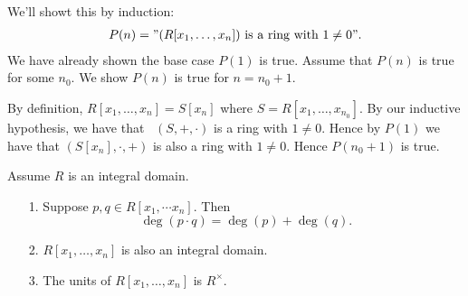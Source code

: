 \begin{prf}
    We'll showt this by induction:
    \begin{align*}
        P(n) = "(R[x_1, \dots, x_n]) \text{ is a ring with } 1 \ne 0".
    \end{align*}
    We have already shown the base case $P(1)$ is true. Assume
    that $P(n)$ is true for some $n_0$. We show $P(n)$ is true for
    $n = n_0 + 1$.

    By definition, $R[x_1, \dots, x_n] = S[x_n]$ where $S = R[x_1,
    \dots, x_{n_0}]$. By our inductive hypothesis, we have that
    \ $(S, +, \cdot )$ is a ring with $1 \ne 0$. Hence by $P(1)$
    we have that $(S[x_n], \cdot, +)$ is also a ring with $1 \ne
    0$. Hence $P(n_0 +  1)$ is true.
\end{prf}

\begin{proposition}
    Assume $R$ is an integral domain. 
    \begin{itemize}
        \item[1.] Suppose $p, q \in R[x_1, \cdots x_n]$. Then 
        \[
            \deg(p \cdot q) = \deg(p) + \deg(q).   
        \] 
        \item[2.] $R[x_1, \dots, x_n]$ is also an integral
        domain. 

        \item[3.] The units of $R[x_1, \dots, x_n]$ is
        $R^{\times}$.  
    \end{itemize}
\end{proposition}

